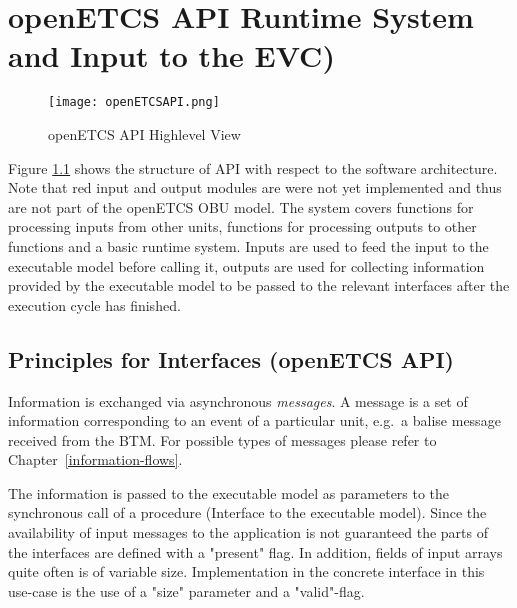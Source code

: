 
\chapter{openETCS API Runtime System and Input to the EVC)}
\label{chp_openETCS_API}

\begin{figure}[hbtp]
\centering
\texttt{[image: openETCSAPI.png]}
\caption{openETCS API Highlevel View}
\label{fig:apiHighLevel}
\end{figure}

Figure \ref{fig:apiHighLevel} shows the structure of API with respect to the software architecture. Note that red input and output modules are were not yet implemented and thus are not part of the openETCS OBU model. The system covers functions for processing inputs from other units, functions for processing outputs to other functions and a basic runtime system. Inputs are used to feed the input to the executable model before calling it, outputs are used for collecting information provided by the executable model to be passed to the relevant interfaces after the execution cycle has finished.

\section{Principles for Interfaces (openETCS API)}

Information is exchanged via asynchronous \emph{messages}. A message is a set of information corresponding to an event of a particular unit, e.g.~a balise message received from the {BTM}. For possible types of messages please refer to Chapter~\ref{information-flows}.

The information is passed to the executable model as parameters to the synchronous call of a procedure (Interface to the executable model). Since the availability of input messages to the application is not guaranteed the parts of the interfaces are defined with a "present" flag. In addition, fields of input arrays quite often is of variable size. Implementation in the concrete interface in this use-case is the use of a "size" parameter and a "valid"-flag.



